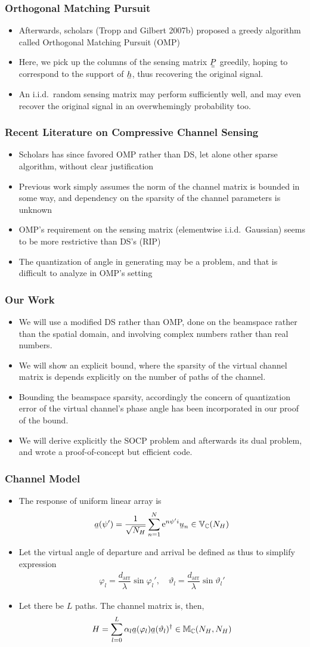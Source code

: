 \documentclass{beamer}
\newcommand{\Disp}[1]{\begin{align} #1 \end{align}}
\renewcommand{\H}{\dagger}
\newcommand{\f}{\varphi}
\renewcommand{\th}{\vartheta}
\newcommand{\I}{\item}
\newcommand{\MB}[1]{\mathbb{#1}}
\newcommand{\RM}[1]{\mathrm{#1}}
\newcommand{\R}[1]{\sqrt{#1}}
\newcommand{\F}[1]{\frac{#1}}
\newcommand{\V}[1]{\stackunder[1.2pt]{$#1$}{\rule{.9ex}{.075ex}}}
\newcommand{\M}[1]{\V{\V{#1}}}
\begin{document}
\begin{frame}
\frametitle{Orthogonal Matching Pursuit}
\begin{itemize}
\I Afterwards, scholars (Tropp and Gilbert 2007b) proposed a greedy algorithm called Orthogonal Matching Pursuit (OMP)
\I Here, we pick up the columns of the sensing matrix \(\M{P}\) greedily, hoping to correspond to the support of \(\V{h}\), thus recovering the original signal.
\I An i.i.d.\ random sensing matrix may perform sufficiently well, and may even recover the original signal in an overwhemingly probability too.
\end{itemize}
\end{frame}

\begin{frame}
\frametitle{Recent Literature on Compressive Channel Sensing}
\begin{itemize}
\I Scholars has since favored OMP rather than DS, let alone other sparse algorithm, without clear justification
\I Previous work simply assumes the norm of the channel matrix is bounded in some way, and dependency on the sparsity of the channel parameters is unknown
\I OMP's requirement on the sensing matrix (elementwise i.i.d.\ Gaussian) seems to be more restrictive than DS's (RIP)
\I The quantization of angle in generating may be a problem, and that is difficult to analyze in OMP's setting
\end{itemize}
\end{frame}

\begin{frame}
\frametitle{Our Work}
\begin{itemize}
\I We will use a modified DS rather than OMP, done on the beamspace rather than the spatial domain, and involving complex numbers rather than real numbers.
\I We will show an explicit bound, where the sparsity of the virtual channel matrix is depends explicitly on the number of paths of the channel.
\I Bounding the beamspace sparsity, accordingly the concern of quantization error of the virtual channel's phase angle has been incorporated in our proof of the bound.
\I We will derive explicitly the SOCP problem and afterwards its dual problem, and wrote a proof-of-concept but efficient code.
\end{itemize}
\end{frame}

\begin{frame}
\frametitle{Channel Model}
\begin{itemize}
\I The response of uniform linear array is
\Disp{
\V{a} (\psi')
=\F{1}{\R{N_H}} \sum_{n=1}^{N} \RM{e}^{n \psi' i} \V{u}_n
\in \MB{V}_\MB{C} (N_H)
}
\I Let the virtual angle of departure and arrival be defined as thus to simplify expression
\Disp{
\f_l =\dfrac{d_{\RM{arr}}} {\lambda} \sin \f_l', \quad \th_l =\dfrac{d_{\RM{arr}}} {\lambda} \sin \th_l'
}
\I Let there be \(L\) paths.
The channel matrix is, then,
\Disp{
H
=\sum_{l=0}^L \alpha_l \V{a} (\f_l) \V{a} (\th_l)^\H
\in \MB{M}_\MB{C} (N_H, N_H)
}
\end{itemize}
\end{frame}
\end{document}
